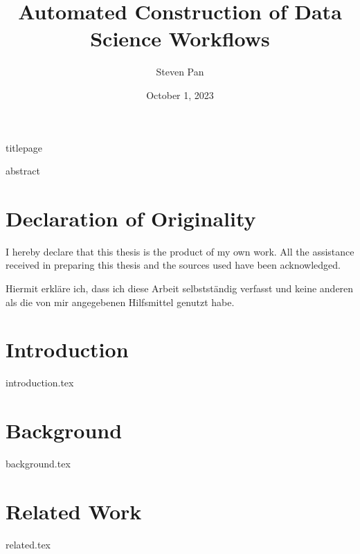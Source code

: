 \documentclass[12pt,twoside]{book}
\title{Automated Construction of Data Science Workflows}
\author{Steven Pan}
\date{October 1, 2023}
\makeatletter
\theoremstyle{definition}
\newcommand\thedate{\@date}
\makeatother
\begin{document}
\frontmatter
{titlepage}
\cleardoublepage


{abstract}
\cleardoublepage


\chapter*{Declaration of Originality}
I hereby declare that this thesis is the product of my own work. All the assistance received in preparing this thesis and the sources used have been acknowledged.

\bigskip
\noindent
Hiermit erkläre ich, dass ich diese Arbeit selbstständig verfasst und keine anderen als die von mir angegebenen Hilfsmittel genutzt habe.

\bigskip
\noindent
\thedate


\tableofcontents
\listoffigures
\listoftables
\lstlistoflistings

\mainmatter
\pagestyle{mainmatter}

\chapter{Introduction}
{introduction.tex}

\chapter{Background}\label{ch:background}
{background.tex}

\chapter{Related Work}\label{ch:related}
{related.tex}
\end{document}

